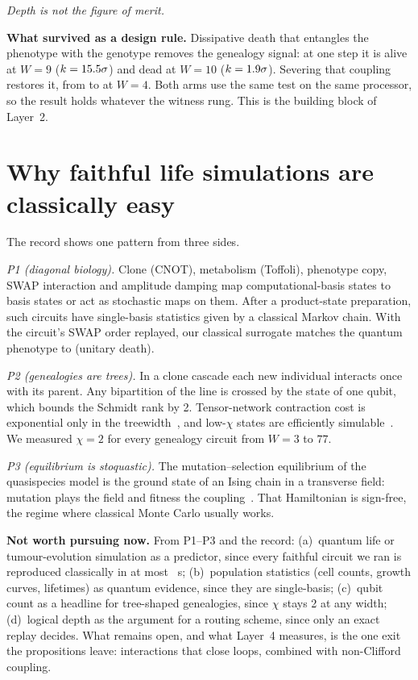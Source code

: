 \documentclass[conference]{IEEEtran}
\begin{document}
\emph{Depth is not the figure of merit.} \teleportParagraph

\textbf{What survived as a design rule.} Dissipative death that entangles the phenotype with the genotype removes
the genealogy signal: at one step it is alive at $W=9$ ($k=15.5\sigma$) and dead at $W=10$ ($k=1.9\sigma$).
Severing that coupling restores it, from \pjEntNat{} to \pjSepNat{} at $W=4$. Both arms use the same test on the same
processor, so the result holds whatever the witness rung. This is the building block of Layer~2.

\section{Why faithful life simulations are classically easy}\label{sec:easy}
The record shows one pattern from three sides.

\emph{P1 (diagonal biology).} Clone (CNOT), metabolism (Toffoli), phenotype copy, SWAP interaction and amplitude
damping map computational-basis states to basis states or act as stochastic maps on them. After a product-state
preparation, such circuits have single-basis statistics given by a classical Markov chain. With the circuit's SWAP
order replayed, our classical surrogate matches the quantum phenotype to \surrUnitaryFixed{} (unitary death).

\emph{P2 (genealogies are trees).} In a clone cascade each new individual interacts once with its parent. Any
bipartition of the line is crossed by the state of one qubit, which bounds the Schmidt rank by 2.
Tensor-network contraction cost is exponential only in the treewidth~\cite{markov2008}, and low-$\chi$ states are
efficiently simulable~\cite{vidal2003}. We measured $\chi=2$ for every genealogy circuit from $W=3$ to $77$.

\emph{P3 (equilibrium is stoquastic).} The mutation--selection equilibrium of the quasispecies model is the ground
state of an Ising chain in a transverse field: mutation plays the field and fitness the coupling~\cite{baake1997}.
That Hamiltonian is sign-free, the regime where classical Monte Carlo usually works.

\textbf{Not worth pursuing now.} From P1--P3 and the record:
(a)~quantum life or tumour-evolution simulation as a predictor, since every faithful circuit we ran is reproduced
classically in at most \costMaxS{}~s;
(b)~population statistics (cell counts, growth curves, lifetimes) as quantum evidence, since they are single-basis;
(c)~qubit count as a headline for tree-shaped genealogies, since $\chi$ stays 2 at any width;
(d)~logical depth as the argument for a routing scheme, since only an exact replay decides.
What remains open, and what Layer~4 measures, is the one exit the propositions leave: interactions that close
loops, combined with non-Clifford coupling.
\end{document}

